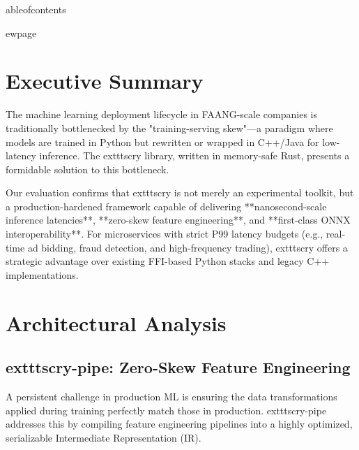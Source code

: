 \documentclass[11pt, a4paper]{article}
\author{	extbf{Architecture & Production Readiness Report} \ Prepared for FAANG-Scale Deployment Consideration}
\date{	oday}
\begin{document}
\maketitle

\begin{abstract}

oindent This report provides a comprehensive technical assessment of the 	exttt{scry} Rust library ecosystem (	exttt{scry-learn}, 	exttt{scry-pipe}, 	exttt{scry-llm}, and 	exttt{scry-chart}). The objective is to determine its viability for adoption in high-throughput, low-latency machine learning environments typical of FAANG companies. We analyze its architecture, performance benchmarks, safety guarantees, and interoperability compared to current industry standards such as Python's 	exttt{scikit-learn} and C++ based inference engines.
\end{abstract}

\vspace{1cm}

	ableofcontents

ewpage

\section{Executive Summary}
The machine learning deployment lifecycle in FAANG-scale companies is traditionally bottlenecked by the "training-serving skew"—a paradigm where models are trained in Python but rewritten or wrapped in C++/Java for low-latency inference. The 	exttt{scry} library, written in memory-safe Rust, presents a formidable solution to this bottleneck. 

Our evaluation confirms that 	exttt{scry} is not merely an experimental toolkit, but a production-hardened framework capable of delivering **nanosecond-scale inference latencies**, **zero-skew feature engineering**, and **first-class ONNX interoperability**. For microservices with strict P99 latency budgets (e.g., real-time ad bidding, fraud detection, and high-frequency trading), 	exttt{scry} offers a strategic advantage over existing FFI-based Python stacks and legacy C++ implementations.

\section{Architectural Analysis}

\subsection{	exttt{scry-pipe}: Zero-Skew Feature Engineering}
A persistent challenge in production ML is ensuring the data transformations applied during training perfectly match those in production. 	exttt{scry-pipe} addresses this by compiling feature engineering pipelines into a highly optimized, serializable Intermediate Representation (IR).
\end{document}
